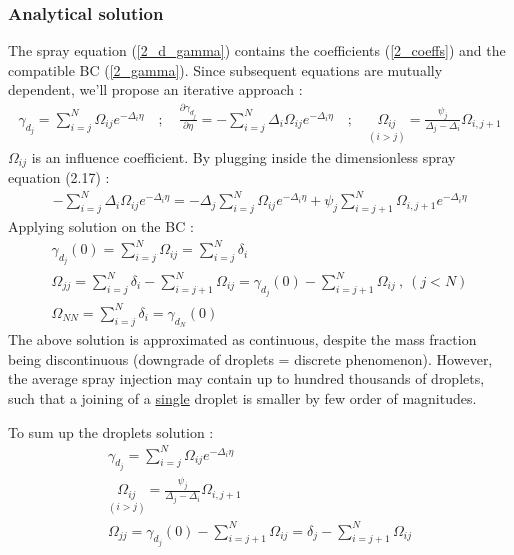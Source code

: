 \documentclass[12pt]{article}
\numberwithin{equation}{section}
\begin{document}
\begin{flushleft}
\newpage

\subsubsection{Analytical solution}

The spray equation (\ref{2_d_gamma}) contains the coefficients (\ref{2_coeffs}) and the compatible BC (\ref{2_gamma}). Since subsequent equations are mutually dependent, we'll propose an iterative approach :
\begin{align} 
\gamma_{d_{j}}=\sum_{i=j}^{N} \Omega_{i j} e^{-\Delta_{i} \eta} \quad ; \quad \frac{\partial \gamma_{d_{j}}}{\partial \eta}=-\sum_{i=j}^{N} \Delta_{i} \Omega_{i j} e^{-\Delta_{i} \eta} \quad ; \quad  \underset{(i>j)}{\Omega_{i j}}=\frac{\psi_{j}}{\Delta_{j}-\Delta_{i}} \Omega_{i, j+1} \label{2_dimen_less}
\end{align}
$\Omega_{i j}$ is an influence coefficient. By plugging inside the dimensionless spray equation (2.17) :
\begin{align} 
-\sum_{i=j}^{N} \Delta_{i} \Omega_{i j} e^{-\Delta_{i} \eta}=-\Delta_{j} \sum_{i=j}^{N} \Omega_{i j} e^{-\Delta_{i}\eta}+\psi_{j} \sum_{i=j+1}^{N} \Omega_{i, j+1} e^{-\Delta_{i} \eta}
\end{align}
Applying solution on the BC :
\begin{align} 
\gamma_{d_{j}}(0)=\sum_{i=j}^{N} \Omega_{i j}=\sum_{i=j}^{N} \delta_{i} \\
\Omega_{j j}=\sum_{i=j}^{N} \delta_{i}-\sum_{i=j+1}^{N} \Omega_{i j}=\gamma_{d_{j}}(0)-\sum_{i=j+1}^{N} \Omega_{i j}\ , \ (j<N) \\
\Omega_{N N}=\sum_{i=j}^{N} \delta_{i}=\gamma_{d_{N}}(0)
\end{align}
The above solution is approximated as continuous, despite the mass fraction being discontinuous (downgrade of droplets = discrete phenomenon). However, the average spray
injection may contain up to hundred thousands of droplets, such that a joining of a \underline{single} droplet is smaller by few order of magnitudes.

To sum up the droplets solution :
\begin{align} 
\gamma_{d_{j}}=\sum_{i=j}^{N} \Omega_{i j} e^{-\Delta_{i} \eta} \\
\underset{(i>j)}{\Omega_{i j}} = \frac{\psi_{j}}{\Delta_{j}-\Delta_{i}} \Omega_{i, j+1} \\
\Omega_{j j}=\gamma_{d_{j}}(0)-\sum_{i=j+1}^{N} \Omega_{i j}=\delta_{j}-\sum_{i=j+1}^{N} \Omega_{i j}
\end{align}


\end{flushleft}
\end{document}
